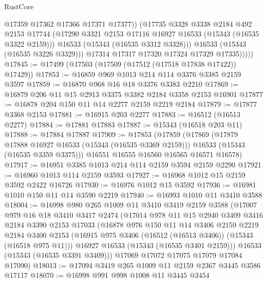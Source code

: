 \begin{lexlean}{RustCore}
\begin{coremodule}
                    @17359
                    @17362
                    @17366
                    @17371
                    @17377))
                (@17735
                  @3328
                  @3338
                  @2184
                  @492
                  @2153
                  @17744
                  (@17290 @3321 @2153 @17116 @16927 @16533 (@15343 (@16535 @3322 @2159)))
                  @16533
                  (@15343 (@16535 @3312 @3328)))
                @16533
                (@15343 (@16535 @3226 @3329)))
              @17314
              @17317
              @17320
              @17324
              @17329
              @17335)))))
@17845 := @17499 (@17503 (@17509 (@17512 (@17518 @17838 @17422)) @17429))
@17853 := @16859 @969 @1013 @214 @114 @3376 @3385 @2159 @3597
@17859 := @16870 @968 @16 @18 @3376 @3383 @2210
@17869 := @16879 @206 @11 @15 @2913 @3375 @3382 @2184 @3358 @2153 @16901
@17877 := @16878 @204 @150 @11 @14 @2277 @2159 @2219 @2184
@17879 := @17877 @3368 @2153
@17881 := @16915 @203 @2277
@17883 := @16512 (@16513 @2277)
@17884 := @17881 @17883
@17887 := @15343 (@16518 @203 @11)
@17888 := @17884 @17887
@17909 := @17853
    (@17859
      (@17869
        (@17879 @17888 @16927 @16533 (@15343 (@16535 @3369 @2159)))
        @16533
        (@15343 (@16535 @3359 @3375)))
      @16551
      @16555
      @16560
      @16565
      @16571
      @16578)
@17917 := @16951 @3385 @1013 @214 @114 @2159 @3594 @2159 @2290
@17921 := @16960 @1013 @114 @2159 @3593
@17927 := @16968 @1012 @15 @2159 @3592 @2422 @16726
@17930 := @16976 @1012 @15 @3592
@17936 := @16981 @1010 @150 @11 @14 @3590 @2219
@17940 := @16993 @1010 @11 @3410 @3588
@18004 := @16998
    @980
    @265
    @1009
    @11
    @3410
    @3419
    @2159
    @3588
    (@17007
      @979
      @16
      @18
      @3410
      @3417
      @2474
      (@17014
        @978
        @11
        @15
        @2940
        @3409
        @3416
        @2184
        @3390
        @2153
        @17033
        (@16878
          @976
          @150
          @11
          @14
          @3406
          @2159
          @2219
          @2184
          @3400
          @2153
          (@16915 @975 @3406 (@16512 (@16513 @3406)) (@15343 (@16518 @975 @11)))
          @16927
          @16533
          (@15343 (@16535 @3401 @2159)))
        @16533
        (@15343 (@16535 @3391 @3409)))
      @17069
      @17072
      @17075
      @17079
      @17084
      @17090)
@18013 := @17094 @3419 @265 @1009 @11 @2159 @2367 @3445 @3586 @17117
@18070 := @16998
    @991
    @998
    @1008
    @11
    @3445
    @3454

\end{coremodule}
\end{lexlean}
